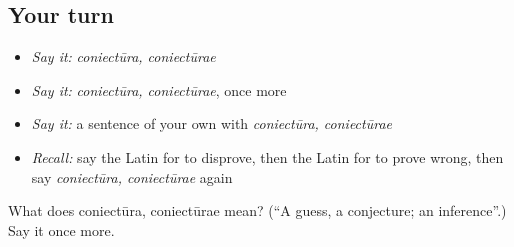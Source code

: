 \subsection*{Your turn}
\begin{itemize}
\raggedright
  \item \emph{Say it:} \emph{coniectūra, coniectūrae}
  \item \emph{Say it:} \emph{coniectūra, coniectūrae}, once more
  \item \emph{Say it:} a sentence of your own with \emph{coniectūra, coniectūrae}
  \item \emph{Recall:} say the Latin for to disprove, then the Latin for to prove wrong, then say \emph{coniectūra, coniectūrae} again
\end{itemize}

\begin{tcolorbox}[breakable,colback=teal!4,colframe=teal!35!black,title={Before you move on}]
What does coniectūra, coniectūrae mean? (\textquotedblleft{}A guess, a conjecture; an inference\textquotedblright{}.) Say it once more.
\end{tcolorbox}
